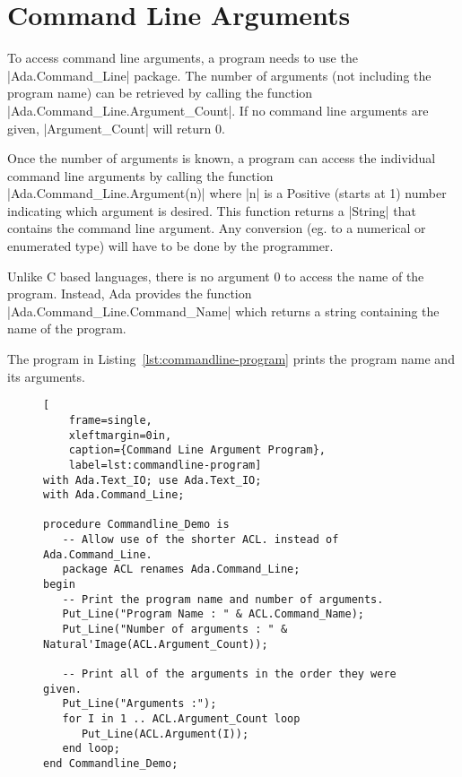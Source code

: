\section{Command Line Arguments}

To access command line arguments, a program needs to use the |Ada.Command_Line| package. The
number of arguments (not including the program name) can be retrieved by calling the function
|Ada.Command_Line.Argument_Count|. If no command line arguments are given, |Argument_Count| will
return 0.

Once the number of arguments is known, a program can access the individual command line
arguments by calling the function |Ada.Command_Line.Argument(n)| where |n| is a Positive (starts
at 1) number indicating which argument is desired. This function returns a |String| that
contains the command line argument. Any conversion (eg. to a numerical or enumerated type) will
have to be done by the programmer.

Unlike C based languages, there is no argument 0 to access the name of the program. Instead, Ada
provides the function |Ada.Command_Line.Command_Name| which returns a string containing the name
of the program.

The program in Listing~\ref{lst:commandline-program}  prints the program name and its arguments.

\begin{figure}[tbhp]
\begin{lstlisting}[
    frame=single,
    xleftmargin=0in,
    caption={Command Line Argument Program},
    label=lst:commandline-program]
with Ada.Text_IO; use Ada.Text_IO;
with Ada.Command_Line;

procedure Commandline_Demo is
   -- Allow use of the shorter ACL. instead of Ada.Command_Line.
   package ACL renames Ada.Command_Line;
begin
   -- Print the program name and number of arguments.
   Put_Line("Program Name : " & ACL.Command_Name);
   Put_Line("Number of arguments : " & Natural'Image(ACL.Argument_Count));

   -- Print all of the arguments in the order they were given.
   Put_Line("Arguments :");
   for I in 1 .. ACL.Argument_Count loop
      Put_Line(ACL.Argument(I));
   end loop;
end Commandline_Demo;
\end{lstlisting}
\end{figure}

